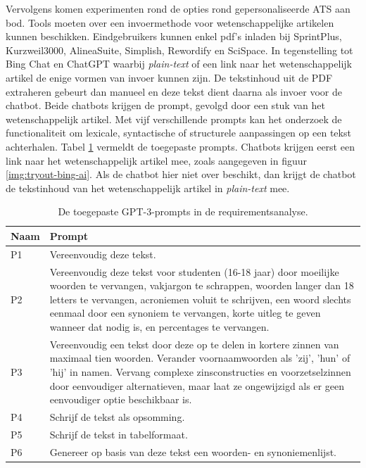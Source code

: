 \medspace

Vervolgens komen experimenten rond de opties rond gepersonaliseerde ATS aan bod. Tools moeten over een invoermethode voor wetenschappelijke artikelen kunnen beschikken. Eindgebruikers kunnen enkel pdf's inladen bij SprintPlus, Kurzweil3000, AlineaSuite, Simplish, Rewordify en SciSpace. In tegenstelling tot Bing Chat en ChatGPT waarbij \textit{plain-text} of een link naar het wetenschappelijk artikel de enige vormen van invoer kunnen zijn. De tekstinhoud uit de PDF extraheren gebeurt dan manueel en deze tekst dient daarna als invoer voor de chatbot. Beide chatbots krijgen de prompt, gevolgd door een stuk van het wetenschappelijk artikel. Met vijf verschillende prompts kan het onderzoek de functionaliteit om lexicale, syntactische of structurele aanpassingen op een tekst achterhalen. Tabel \ref{table:tested-prompts-requirementsanalysis} vermeldt de toegepaste prompts. Chatbots krijgen eerst een link naar het wetenschappelijk artikel mee, zoals aangegeven in figuur \ref{img:tryout-bing-ai}. Als de chatbot hier niet over beschikt, dan krijgt de chatbot de tekstinhoud van het wetenschappelijk artikel in \textit{plain-text} mee.

\begin{center}
	\begin{table}[H]
		\begin{tabular}{ | m{2cm} | m{14cm} | } 
			\hline
			\textbf{Naam} & \textbf{Prompt} \\
			\hline
			P1 & Vereenvoudig deze tekst. \\
			\hline
			P2 & Vereenvoudig deze tekst voor studenten (16-18 jaar) door moeilijke woorden te vervangen, vakjargon te schrappen, woorden langer dan 18 letters te vervangen, acroniemen voluit te schrijven, een woord slechts eenmaal door een synoniem te vervangen, korte uitleg te geven wanneer dat nodig is, en percentages te vervangen. \\
			\hline
			P3 & Vereenvoudig een tekst door deze op te delen in kortere zinnen van maximaal tien woorden. Verander voornaamwoorden als 'zij', 'hun' of 'hij' in namen. Vervang complexe zinsconstructies en voorzetselzinnen door eenvoudiger alternatieven, maar laat ze ongewijzigd als er geen eenvoudiger optie beschikbaar is. \\
			\hline
			P4 & Schrijf de tekst als opsomming. \\
			\hline
			P5 & Schrijf de tekst in tabelformaat. \\
			\hline
			P6 & Genereer op basis van deze tekst een woorden- en synoniemenlijst. \\
			\hline
		\end{tabular}
		\caption{De toegepaste GPT-3-prompts in de requirementsanalyse.}
		\label{table:tested-prompts-requirementsanalysis}
	\end{table}
\end{center}

